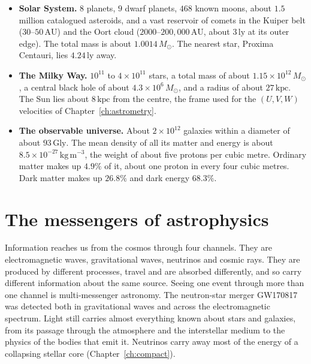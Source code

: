 \begin{itemize}[leftmargin=1.5em, itemsep=0.2em]
	\item \textbf{Solar System.} $8$ planets, $9$ dwarf planets, $468$ known moons, about $1.5$ million catalogued asteroids, and a vast reservoir of comets in the Kuiper belt ($30\text{--}50\,\mathrm{AU}$) and the Oort cloud ($2000\text{--}200{,}000\,\mathrm{AU}$, about $3\,\mathrm{ly}$ at its outer edge). The total mass is about $1.0014\,M_\odot$. The nearest star, Proxima Centauri, lies $4.24\,\mathrm{ly}$ away.
	\item \textbf{The Milky Way.} $10^{11}$ to $4\times10^{11}$ stars, a total mass of about $1.15\times10^{12}\,M_\odot$, a central black hole of about $4.3\times10^{6}\,M_\odot$, and a radius of about $27\,\mathrm{kpc}$. The Sun lies about $8\,\mathrm{kpc}$ from the centre, the frame used for the $(U,V,W)$ velocities of Chapter~\ref{ch:astrometry}.
	\item \textbf{The observable universe.} About $2\times10^{12}$ galaxies within a diameter of about $93\,\mathrm{Gly}$. The mean density of all its matter and energy is about $8.5\times10^{-27}\,\mathrm{kg\,m^{-3}}$, the weight of about five protons per cubic metre. Ordinary matter makes up $4.9\%$ of it, about one proton in every four cubic metres. Dark matter makes up $26.8\%$ and dark energy $68.3\%$.
\end{itemize}

\section*{The messengers of astrophysics}

Information reaches us from the cosmos through four channels. They are electromagnetic waves, gravitational waves, neutrinos and cosmic rays. They are produced by different processes, travel and are absorbed differently, and so carry different information about the same source. Seeing one event through more than one channel is multi-messenger astronomy. The neutron-star merger GW170817 was detected both in gravitational waves and across the electromagnetic spectrum. Light still carries almost everything known about stars and galaxies, from its passage through the atmosphere and the interstellar medium to the physics of the bodies that emit it. Neutrinos carry away most of the energy of a collapsing stellar core (Chapter~\ref{ch:compact}).
